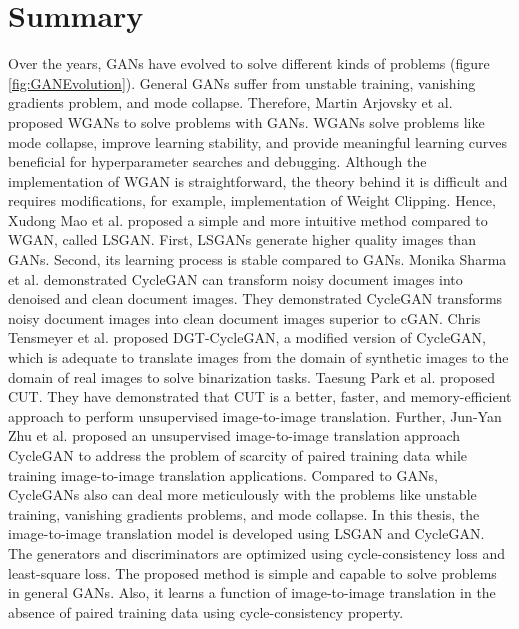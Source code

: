 \section{Summary}\label{rwsummary}
Over the years, \acp{GAN} have evolved to solve different kinds of problems (figure \ref{fig:GANEvolution}). General \acp{GAN} suffer from unstable training, vanishing gradients problem, and mode collapse. Therefore, Martin Arjovsky et al.\cite{arjovsky2017wasserstein} proposed \acp{WGAN} to solve problems with \acp{GAN}. \acp{WGAN} solve problems like mode collapse, improve learning stability, and provide meaningful learning curves beneficial for hyperparameter searches and debugging\cite{arjovsky2017wasserstein}. Although the implementation of \ac{WGAN} is straightforward, the theory behind it is difficult and requires modifications, for example, implementation of Weight Clipping\cite{gulrajani2017improved}. Hence, Xudong Mao et al.\cite{mao2017squares} proposed a simple and more intuitive method compared to \ac{WGAN}, called \ac{LSGAN}. First, \acp{LSGAN} generate higher quality images than \acp{GAN}\cite{mao2017squares}. Second, its learning process is stable compared to \acp{GAN}\cite{mao2017squares}. Monika Sharma et al.\cite{sharma2019learning} demonstrated \ac{CycleGAN} can transform noisy document images into denoised and clean document images. They demonstrated \ac{CycleGAN} transforms noisy document images into clean document images superior to \ac{cGAN}. Chris Tensmeyer et al.\cite{8978087} proposed DGT-CycleGAN, a modified version of \ac{CycleGAN}, which is adequate to translate images from the domain of synthetic images to the domain of real images to solve binarization tasks. Taesung Park et al.\cite{park2020contrastive} proposed \ac{CUT}. They have demonstrated that \ac{CUT} is a better, faster, and memory-efficient approach to perform unsupervised image-to-image translation. Further, Jun-Yan Zhu et al.\cite{zhu2020unpaired} proposed an unsupervised image-to-image translation approach \ac{CycleGAN} to address the problem of scarcity of paired training data while training image-to-image translation applications. Compared to \acp{GAN}, \acp{CycleGAN} also can deal more meticulously with the problems like unstable training, vanishing gradients problems, and mode collapse. In this thesis, the image-to-image translation model is developed using \ac{LSGAN} and \ac{CycleGAN}. The generators and discriminators are optimized using cycle-consistency loss\cite{zhu2020unpaired} and least-square loss\cite{mao2017squares}. The proposed method is simple and capable to solve problems in general \acp{GAN}. Also, it learns a function of image-to-image translation in the absence of paired training data using cycle-consistency property\cite{zhu2020unpaired}.



